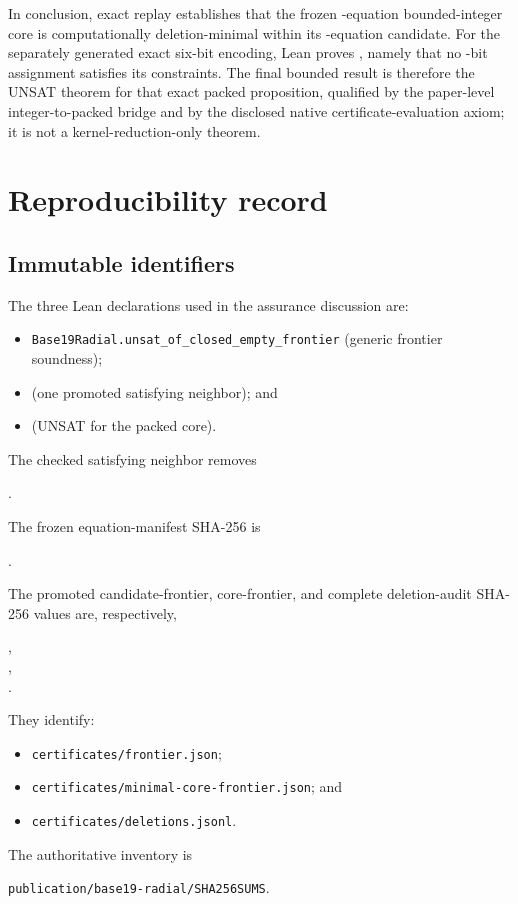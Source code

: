 \documentclass[11pt,twoside]{article}
\theoremstyle{remark}
\begin{document}
In conclusion, exact replay establishes that the frozen
\CoreEquationCount-equation bounded-integer core is computationally
deletion-minimal within its \CandidateEquationCount-equation candidate.  For
the separately generated exact six-bit encoding, Lean proves
\PackedTheorem{}, namely that no \PackedWidth-bit assignment satisfies its
\PackedConstraintCount{} constraints.  The final bounded result is therefore
the UNSAT theorem for that exact packed proposition, qualified by the
paper-level integer-to-packed bridge and by the disclosed native
certificate-evaluation axiom; it is not a kernel-reduction-only theorem.

\appendix
\section{Reproducibility record}
\label{app:reproducibility}

\subsection{Immutable identifiers}

The three Lean declarations used in the assurance discussion are:
\begin{itemize}[leftmargin=*,itemsep=1pt,topsep=3pt]
  \item \nolinkurl{Base19Radial.unsat_of_closed_empty_frontier}
        (generic frontier soundness);
  \item \ConcreteSatTheorem{} (one promoted satisfying neighbor); and
  \item \PackedTheorem{} (UNSAT for the packed core).
\end{itemize}
The checked satisfying neighbor removes
\begin{center}
  \KnownSatRemovedEquation.
\end{center}
The frozen equation-manifest SHA-256 is
\begin{center}
  \PackedManifestSha.
\end{center}
The promoted candidate-frontier, core-frontier, and complete deletion-audit
SHA-256 values are, respectively,
\begin{center}
  \CandidateCertificateSha,\\[3pt]
  \CoreCertificateSha,\\[3pt]
  \DeletionAuditSha.
\end{center}
They identify:
\begin{itemize}[leftmargin=*,itemsep=1pt,topsep=3pt]
  \item \texttt{certificates/frontier.json};
  \item \texttt{certificates/minimal-core-frontier.json}; and
  \item \texttt{certificates/deletions.jsonl}.
\end{itemize}
The authoritative inventory is
\begin{center}
  \texttt{publication/base19-radial/SHA256SUMS}.
\end{center}
\end{document}
